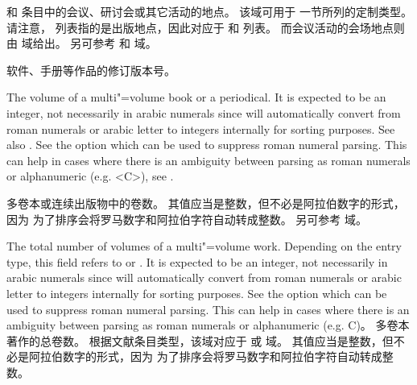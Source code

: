 \begin{fieldlist}

 和  条目中的会议、研讨会或其它活动的地点。
该域可用于  一节所列的定制类型。
请注意， 列表指的是出版地点，因此对应于  和  列表。
而会议活动的会场地点则由  域给出。
另可参考  和  域。




软件、手册等作品的修订版本号。



The volume of a multi"=volume book or a periodical. It is expected to be an integer, not necessarily in arabic numerals since \biber will automatically convert from roman numerals or arabic letter to integers internally for sorting purposes. See also . See the  option which can be used to suppress roman numeral parsing. This can help in cases where there is an ambiguity between parsing as roman numerals or alphanumeric (e.g. <C>), see .


多卷本或连续出版物中的卷数。
其值应当是整数，但不必是阿拉伯数字的形式，因为 \biber 为了排序会将罗马数字和阿拉伯字符自动转成整数。
另可参考  域。




The total number of volumes of a multi"=volume work. Depending on the entry type, this field refers to  or . It is expected to be an integer, not necessarily in arabic numerals since \biber will automatically convert from roman numerals or arabic letter to integers internally for sorting purposes. See the  option which can be used to suppress roman numeral parsing. This can help in cases where there is an ambiguity between parsing as roman numerals or alphanumeric (e.g. C)。
多卷本著作的总卷数。
根据文献条目类型，该域对应于  或  域。
其值应当是整数，但不必是阿拉伯数字的形式，因为 \biber 为了排序会将罗马数字和阿拉伯字符自动转成整数。


\end{fieldlist}
